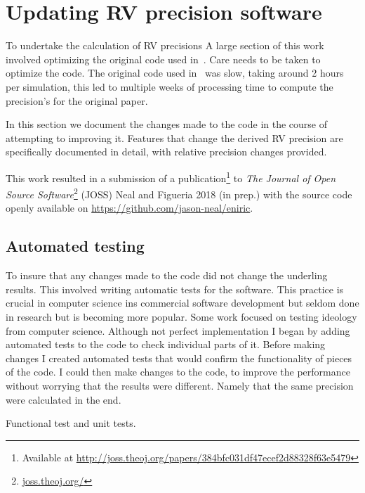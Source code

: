 \clearpage

\section{Updating {RV} precision software}
To undertake the calculation of RV precisions
A large section of this work involved optimizing the original code used in~\citet{figueira_radial_2016}.
Care needs to be taken to optimize the code.
The original code used in~\citet{figueira_radial_2016} was slow, taking around 2 hours per simulation, this led to multiple weeks of processing time to compute the precision's for the original paper.

In this section we document the changes made to the code in the course of attempting to improving it.
Features that change the derived {RV} precision are specifically documented in detail, with relative precision changes provided.

This work resulted in a submission of a publication\footnote{Available at \href{http://joss.theoj.org/papers/384bfc031df47ecef2d88328f63e5479}{http://joss.theoj.org/papers/384bfc031df47ecef2d88328f63e5479}} to \emph{The Journal of Open Source Software}\footnote{\href{http://joss.theoj.org/}{joss.theoj.org/}} (JOSS) {Neal and Figueria 2018 (in prep.)} with the source code openly available on \href{Github}{https://github.com/jason-neal/eniric}.


\subsection{Automated testing}
To insure that any changes made to the code did not change the underling results.
This involved writing automatic tests for the software.
This practice is crucial in computer science ins commercial software development but seldom done in research but is becoming more popular. 
Some work focused on testing ideology from computer science.
Although not perfect implementation I began by adding automated tests to the code to check individual parts of it.
Before making changes I created automated tests that would confirm the functionality of pieces of the code.
I could then make changes to the code, to improve the performance without worrying that the results were different.
Namely that the same precision were calculated in the end.

Functional test and unit tests.


